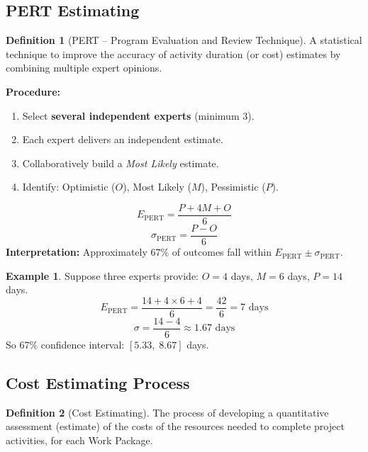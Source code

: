 \documentclass[11pt,a4paper]{article}
\theoremstyle{definition}
\newtheorem{definition}{Definition}[section]
\newtheorem{example}{Example}[section]
\theoremstyle{plain}
\begin{document}
\subsection{PERT Estimating}

\begin{definition}[PERT -- Program Evaluation and Review Technique]
A statistical technique to improve the accuracy of activity duration (or cost) estimates by combining multiple expert opinions.

\textbf{Procedure:}
\begin{enumerate}[label=\arabic*.]
  \item Select \textbf{several independent experts} (minimum 3).
  \item Each expert delivers an independent estimate.
  \item Collaboratively build a \emph{Most Likely} estimate.
  \item Identify: Optimistic ($O$), Most Likely ($M$), Pessimistic ($P$).
\end{enumerate}
\end{definition}

\begin{formulabox}
\[
  E_{\mathrm{PERT}} = \frac{P + 4M + O}{6}
\]
\[
  \sigma_{\mathrm{PERT}} = \frac{P - O}{6}
\]
\textbf{Interpretation:} Approximately $67\%$ of outcomes fall within $E_{\mathrm{PERT}} \pm \sigma_{\mathrm{PERT}}$.
\end{formulabox}

\begin{example}
Suppose three experts provide: $O = 4$ days, $M = 6$ days, $P = 14$ days.
\[
  E_{\mathrm{PERT}} = \frac{14 + 4 \times 6 + 4}{6} = \frac{42}{6} = 7 \text{ days}
\]
\[
  \sigma = \frac{14 - 4}{6} \approx 1.67 \text{ days}
\]
So 67\% confidence interval: $[5.33,\; 8.67]$ days.
\end{example}

\subsection{Cost Estimating Process}

\begin{definition}[Cost Estimating]
The process of developing a quantitative assessment (estimate) of the costs of the resources needed to complete project activities, for each Work Package.
\end{definition}
\end{document}
